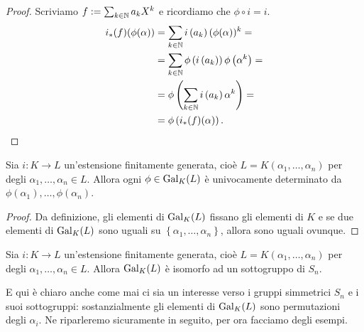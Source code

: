 \begin{proof}
Scriviamo $f := \sum_{k \in \N} a_k X^k$ e ricordiamo che $\phi \circ i = i$.
\begin{align*}
i_\ast (f) (\phi(\alpha)) &= \sum_{k \in \N} i\left(a_k\right) (\phi(\alpha))^k = \\
                          &= \sum_{k \in \N} \phi\left(i\left(a_k\right)\right) \phi\left(\alpha^k\right) = \\
                          &= \phi\left( \sum_{k \in \N} i\left(a_k\right) \alpha^k \right) = \\
                          &= \phi\left(i_\ast(f)(\alpha)\right) .\qedhere
\end{align*}
\end{proof}

\begin{prop}
Sia $i : K \to L$ un'estensione finitamente generata, cioè $L = K\left(\alpha_1, \dots{}, \alpha_n\right)$ per degli $\alpha_1, \dots{}, \alpha_n \in L$. Allora ogni $\phi \in \Gal[K]{L}$ è univocamente determinato da $\phi\left(\alpha_1\right), \dots{}, \phi\left(\alpha_n\right)$.
\end{prop}

\begin{proof}
Da definizione, gli elementi di $\Gal[K]{L}$ fissano gli elementi di $K$ e se due elementi di $\Gal[K]{L}$ sono uguali su $\left\{\alpha_1, \dots{}, \alpha_n\right\}$, allora sono uguali ovunque.
\end{proof}

\begin{coro}
Sia $i : K \to L$ un'estensione finitamente generata, cioè $L = K\left(\alpha_1, \dots{}, \alpha_n\right)$ per degli $\alpha_1, \dots{}, \alpha_n \in L$. Allora $\Gal[K]{L}$ è isomorfo ad un sottogruppo di $S_n$.
\end{coro}

E qui è chiaro anche come mai ci sia un interesse verso i gruppi simmetrici $S_n$ e i suoi sottogruppi: sostanzialmente gli elementi di $\Gal[K]{L}$ sono permutazioni degli $\alpha_i$. Ne riparleremo sicuramente in seguito, per ora facciamo degli esempi.

\begin{esem}
\end{esem}


